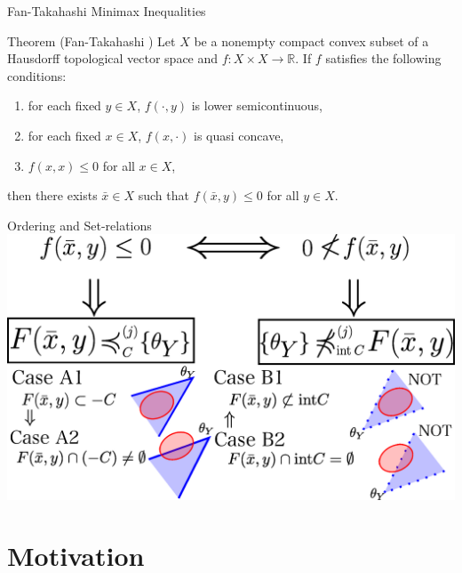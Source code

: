 \documentclass[aspectratio=169, dvipdfmx, 11pt]{beamer}
\newcommand{\RealNumberSet}{\mathbb{R}}
\begin{document}
\begin{frame}{Fan-Takahashi Minimax Inequalities}
  \begin{block}{Theorem (Fan-Takahashi \cite{MR399979})} %
    Let $X$ be a nonempty compact convex subset of a Hausdorff topological vector space and $f \colon X \times X \to \RealNumberSet$. If $f$ satisfies
    the following conditions:
    \begin{enumerate}
      \item for each fixed $y \in X$, $f(\cdot,y)$ is lower semicontinuous,
      \item for each fixed $x \in X$, $f(x,\cdot)$ is quasi concave,
      \item $f(x,x) \leq 0$ for all $x \in X$,
    \end{enumerate}
    then there exists $\bar{x} \in X$ such that $f(\bar{x},y) \leq 0$ for all $y \in X$.
  \end{block}
\end{frame}

\begin{frame}{Ordering and Set-relations}
  \centering
  \includegraphics[keepaspectratio, scale=0.35]{figures/eps/4types_set_relations.eps}
\end{frame}


\begin{frame}

\end{frame}

\section{Motivation}
\end{document}
